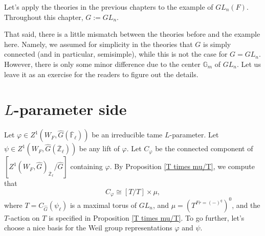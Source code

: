 Let's apply the theories in the previous chapters to the example of $GL_n(F)$. Throughout this chapter, $G:=GL_n$.

That said, there is a little mismatch between the theories before and the example here. Namely, we assumed for simplicity in the theories that $G$ is simply connected (and in particular, semisimple), while this is not the case for $G=GL_n$. However, there is only some minor difference due to the center $\mathbb{G}_m$ of $GL_n$. Let us leave it as an exercise for the readers to figure out the details.

\section{$L$-parameter side} \label{Example Lparam}
Let $\varphi \in Z^1(W_F, \hat{G}(\overline{\mathbb{F}}_{\ell}))$ be an irreducible tame $L$-parameter. Let $\psi \in Z^1(W_F, \hat{G}(\overline{\mathbb{Z}}_{\ell}))$ be any lift of $\varphi$. Let $C_{\varphi}$ be the connected component of $[Z^1(W_F, \hat{G})_{\overline{\mathbb{Z}}_{\ell}}/\hat{G}]$ containing $\varphi$. By Proposition \ref{T times mu/T}, we compute that
$$C_{\varphi} \cong [T/T] \times \mu,$$
where $T=C_{\hat{G}}(\psi_{\ell})$ is a maximal torus of $GL_n$, and $\mu=(T^{Fr=(-)^q})^0$, and the $T$-action on $T$ is specified in Proposition \ref{T times mu/T}. To go further, let's choose a nice basis for the Weil group representations $\varphi$ and $\psi$.


